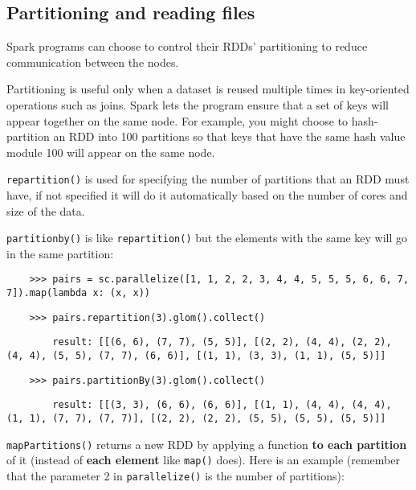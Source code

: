 \subsection{Partitioning and reading files}


Spark programs can choose to control their RDDs' partitioning to reduce communication between the nodes.

Partitioning is useful only when a dataset is reused multiple times in key-oriented operations such as joins.
Spark lets the program ensure that a set of keys will appear together on the same node.
For example, you might choose to hash-partition an RDD into 100 partitions so that keys that have the same hash value module 100 will appear on the same node.


\texttt{repartition()} is used for specifying the number of partitions that an RDD must have, if not specified it will do it automatically based on the number of cores and size of the data.

\texttt{partitionby()} is like \texttt{repartition()} but the elements with the same key will go in the same partition:

\begin{lstlisting}
    >>> pairs = sc.parallelize([1, 1, 2, 2, 3, 4, 4, 5, 5, 5, 6, 6, 7, 7]).map(lambda x: (x, x))
\end{lstlisting}

\begin{lstlisting}
    >>> pairs.repartition(3).glom().collect()
\end{lstlisting}

\begin{lstlisting}
        result: [[(6, 6), (7, 7), (5, 5)], [(2, 2), (4, 4), (2, 2), (4, 4), (5, 5), (7, 7), (6, 6)], [(1, 1), (3, 3), (1, 1), (5, 5)]]
\end{lstlisting}

\begin{lstlisting}
    >>> pairs.partitionBy(3).glom().collect()
\end{lstlisting}

\begin{lstlisting}
        result: [[(3, 3), (6, 6), (6, 6)], [(1, 1), (4, 4), (4, 4), (1, 1), (7, 7), (7, 7)], [(2, 2), (2, 2), (5, 5), (5, 5), (5, 5)]]
\end{lstlisting}


\texttt{mapPartitions()} returns a new RDD by applying a function \textbf{to each partition} of it (instead of \textbf{each element} like \texttt{map()} does). Here is an example (remember that the parameter 2 in \texttt{parallelize()} is the number of partitions):

